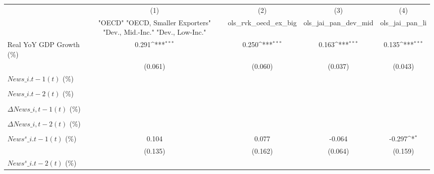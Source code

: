 {
\def\sym#1{\ifmmode^{#1}\else\(^{#1}\)\fi}
\begin{tabular}{l*{4}{c}}
\toprule
                    &\multicolumn{1}{c}{(1)}&\multicolumn{1}{c}{(2)}&\multicolumn{1}{c}{(3)}&\multicolumn{1}{c}{(4)}\\
                    &\multicolumn{1}{c}{ "OECD" "OECD, Smaller Exporters" "Dev., Mid.-Inc." "Dev., Low-Inc."}&\multicolumn{1}{c}{ols\_rvk\_oecd\_ex\_big}&\multicolumn{1}{c}{ols\_jai\_pan\_dev\_mid}&\multicolumn{1}{c}{ols\_jai\_pan\_li}\\
\midrule
Real YoY GDP Growth (\%)&       0.291\sym{***}&       0.250\sym{***}&       0.163\sym{***}&       0.135\sym{***}\\
                    &     (0.061)         &     (0.060)         &     (0.037)         &     (0.043)         \\
\addlinespace
$ News\_{i.t-1}(t)$ (\%)&                     &                     &                     &                     \\
                    &                     &                     &                     &                     \\
\addlinespace
$ News\_{i.t-2}(t)$ (\%)&                     &                     &                     &                     \\
                    &                     &                     &                     &                     \\
\addlinespace
$ \Delta News\_{i,t-1}(t)$ (\%)&                     &                     &                     &                     \\
                    &                     &                     &                     &                     \\
\addlinespace
$ \Delta News\_{i,t-2}(t)$ (\%)&                     &                     &                     &                     \\
                    &                     &                     &                     &                     \\
\addlinespace
$ News^s\_{i.t-1}(t)$ (\%)&       0.104         &       0.077         &      -0.064         &      -0.297\sym{*}  \\
                    &     (0.135)         &     (0.162)         &     (0.064)         &     (0.159)         \\
\addlinespace
$ News^s\_{i.t-2}(t)$ (\%)&                     &                     &                     &                     \\

\end{tabular}}
